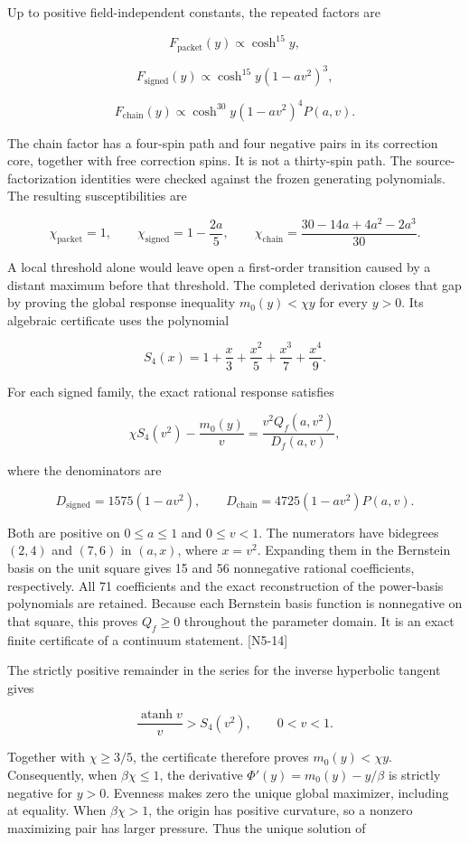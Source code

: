 Up to positive field-independent constants, the repeated factors are

\[F_{\mathrm{packet}}(y)\propto\cosh^{15}y,\]

\[F_{\mathrm{signed}}(y)\propto\cosh^{15}y(1-av^2)^3,\]

\[F_{\mathrm{chain}}(y)\propto\cosh^{30}y(1-av^2)^4P(a,v).\]

The chain factor has a four-spin path and four negative pairs in its correction core, together with free correction spins. It is not a thirty-spin path. The source-factorization identities were checked against the frozen generating polynomials. The resulting susceptibilities are

\[\chi_{\mathrm{packet}}=1,\qquad
\chi_{\mathrm{signed}}=1-\frac{2a}{5},\qquad
\chi_{\mathrm{chain}}=\frac{30-14a+4a^2-2a^3}{30}.\]

A local threshold alone would leave open a first-order transition caused by a distant maximum before that threshold. The completed derivation closes that gap by proving the global response inequality \(m_0(y)<\chi y\) for every \(y>0\). Its algebraic certificate uses the polynomial

\[S_4(x)=1+\frac{x}{3}+\frac{x^2}{5}+\frac{x^3}{7}+\frac{x^4}{9}.\]

For each signed family, the exact rational response satisfies

\[\chi S_4(v^2)-\frac{m_0(y)}{v}
=\frac{v^2Q_f(a,v^2)}{D_f(a,v)},\]

where the denominators are

\[D_{\mathrm{signed}}=1575(1-av^2),\qquad
D_{\mathrm{chain}}=4725(1-av^2)P(a,v).\]

Both are positive on \(0\le a\le1\) and \(0\le v<1\). The numerators have bidegrees \((2,4)\) and \((7,6)\) in \((a,x)\), where \(x=v^2\). Expanding them in the Bernstein basis on the unit square gives 15 and 56 nonnegative rational coefficients, respectively. All 71 coefficients and the exact reconstruction of the power-basis polynomials are retained. Because each Bernstein basis function is nonnegative on that square, this proves \(Q_f\ge0\) throughout the parameter domain. It is an exact finite certificate of a continuum statement. {[}N5-14{]}

The strictly positive remainder in the series for the inverse hyperbolic tangent gives

\[\frac{\operatorname{atanh}v}{v}>S_4(v^2),\qquad 0<v<1.\]

Together with \(\chi\ge3/5\), the certificate therefore proves \(m_0(y)<\chi y\). Consequently, when \(\beta\chi\le1\), the derivative \(\Phi'(y)=m_0(y)-y/\beta\) is strictly negative for \(y>0\). Evenness makes zero the unique global maximizer, including at equality. When \(\beta\chi>1\), the origin has positive curvature, so a nonzero maximizing pair has larger pressure. Thus the unique solution of

